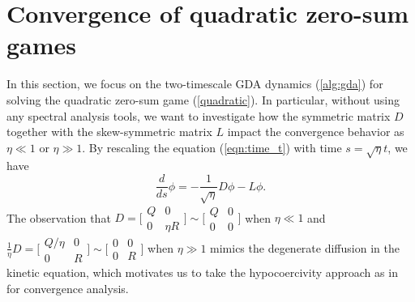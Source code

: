 \documentclass[11pt]{article}
\newcommand{\1}{\mathds{1}}
\begin{document}




\section{Convergence of quadratic zero-sum games}\label{sec:finite-dim}
In this section, we focus on the two-timescale GDA dynamics (\ref{alg:gda}) for solving the quadratic zero-sum game (\ref{quadratic}). In particular, without using any spectral analysis tools, we want to investigate how the symmetric matrix $D$ together with the skew-symmetric matrix $L$ impact the convergence behavior as $\eta\ll1$ or $\eta\gg1$. By rescaling the equation (\ref{eqn:time_t}) with time $s= \sqrt{\eta} t$, we have
\begin{equation}\label{eqn:time_s}
    \frac{d}{d s} \phi = -\frac{1}{\sqrt{\eta}}D \phi- L\phi.
\end{equation}
The observation that
$D = \bigl[\begin{smallmatrix}
            Q & 0\\
            0 & \eta R
        \end{smallmatrix}\bigr]\sim \bigl[\begin{smallmatrix}
            Q & 0\\
            0 & 0
        \end{smallmatrix}\bigr]$ when $\eta\ll 1$ and $\frac{1}{\eta}D = \bigl[ \begin{smallmatrix}
            Q/\eta & 0\\
            0 &  R
        \end{smallmatrix} \bigr] \sim \bigl[\begin{smallmatrix}
            0 & 0\\
            0 & R
        \end{smallmatrix}\bigr]$ when $\eta\gg 1$ mimics the degenerate diffusion in the kinetic equation, which motivates us to take the hypocoercivity approach as in \cite{dolbeault2015hypocoercivity} for convergence analysis. 
\end{document}
